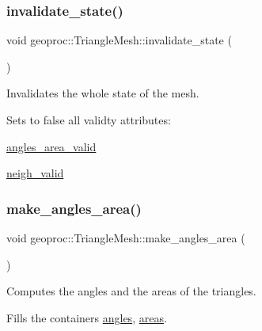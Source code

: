 \subsubsection{\texorpdfstring{invalidate\+\_\+state()}{invalidate\_state()}}
{\footnotesize\ttfamily void geoproc\+::\+Triangle\+Mesh\+::invalidate\+\_\+state (\begin{DoxyParamCaption}{ }\end{DoxyParamCaption})\hspace{0.3cm}{\ttfamily [protected]}}



Invalidates the whole state of the mesh. 

Sets to false all validty attributes\+:
\begin{DoxyItemize}
\item \hyperlink{classgeoproc_1_1TriangleMesh_a046a6679ae404e02ae40d4d4d798b6f6}{angles\+\_\+area\+\_\+valid}
\item \hyperlink{classgeoproc_1_1TriangleMesh_a21205ec88e494f864db4d8247db70d3c}{neigh\+\_\+valid} 
\end{DoxyItemize}\mbox{\label{classgeoproc_1_1TriangleMesh_a4657d7986fd9905c3a7b759e3d1b5442}} 
\subsubsection{\texorpdfstring{make\+\_\+angles\+\_\+area()}{make\_angles\_area()}}
{\footnotesize\ttfamily void geoproc\+::\+Triangle\+Mesh\+::make\+\_\+angles\+\_\+area (\begin{DoxyParamCaption}{ }\end{DoxyParamCaption})}



Computes the angles and the areas of the triangles. 

Fills the containers \hyperlink{classgeoproc_1_1TriangleMesh_ab255af87d20d76ad84246560fa3579b3}{angles}, \hyperlink{classgeoproc_1_1TriangleMesh_a684ecaaa03f1739856bba03167e51dd1}{areas}. \mbox{\label{classgeoproc_1_1TriangleMesh_ad11c9406e2677e4d72d53837206fd769}} 
